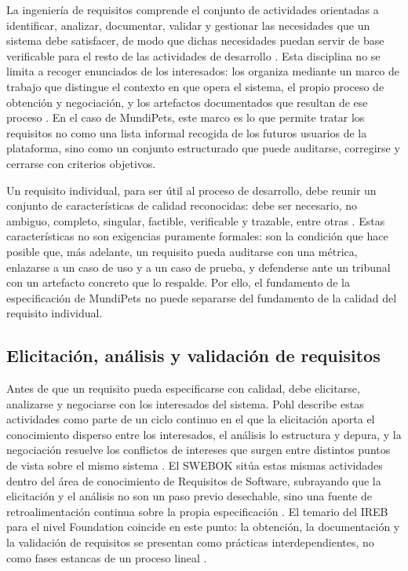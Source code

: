 \documentclass[journal,onecolumn]{IEEEtran}
\begin{document}
	La ingeniería de requisitos comprende el conjunto de actividades orientadas a identificar, analizar,
	documentar, validar y gestionar las necesidades que un sistema debe satisfacer, de modo que dichas
	necesidades puedan servir de base verificable para el resto de las actividades de desarrollo
	\cite{ieee29148,pohl2025}. Esta disciplina no se limita a recoger enunciados de los interesados: los
	organiza mediante un marco de trabajo que distingue el contexto en que opera el sistema, el propio
	proceso de obtención y negociación, y los artefactos documentados que resultan de ese proceso
	\cite{pohl2025}. En el caso de MundiPets, este marco es lo que permite tratar los requisitos no como
	una lista informal recogida de los futuros usuarios de la plataforma, sino como un conjunto
	estructurado que puede auditarse, corregirse y cerrarse con criterios objetivos.
	
	Un requisito individual, para ser útil al proceso de desarrollo, debe reunir un conjunto de
	características de calidad reconocidas: debe ser necesario, no ambiguo, completo, singular, factible,
	verificable y trazable, entre otras \cite{ieee29148}. Estas características no son exigencias
	puramente formales: son la condición que hace posible que, más adelante, un requisito pueda auditarse
	con una métrica, enlazarse a un caso de uso y a un caso de prueba, y defenderse ante un tribunal con
	un artefacto concreto que lo respalde. Por ello, el fundamento de la especificación de MundiPets no
	puede separarse del fundamento de la calidad del requisito individual.
	
	\subsection*{Elicitación, análisis y validación de requisitos}
	
	Antes de que un requisito pueda especificarse con calidad, debe elicitarse, analizarse y negociarse
	con los interesados del sistema. Pohl describe estas actividades como parte de un ciclo continuo en el
	que la elicitación aporta el conocimiento disperso entre los interesados, el análisis lo estructura y
	depura, y la negociación resuelve los conflictos de intereses que surgen entre distintos puntos de
	vista sobre el mismo sistema \cite{pohl2025}. El SWEBOK sitúa estas mismas actividades dentro del área
	de conocimiento de Requisitos de Software, subrayando que la elicitación y el análisis no son un paso
	previo desechable, sino una fuente de retroalimentación continua sobre la propia especificación
	\cite{swebok2024}. El temario del IREB para el nivel Foundation coincide en este punto: la obtención,
	la documentación y la validación de requisitos se presentan como prácticas interdependientes, no como
	fases estancas de un proceso lineal \cite{ireb2026}.
	
\end{document}

